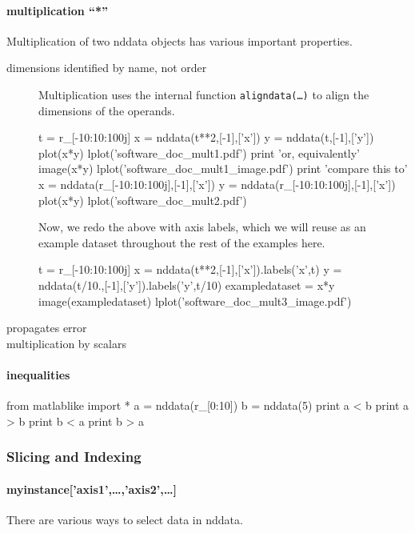 \paragraph{multiplication ``*''}
Multiplication of two nddata objects has various important properties.
\begin{description}
\item[dimensions identified by name, not order]
Multiplication uses the internal function \texttt{aligndata(\ldots)} \label{codelabel:aligndata}
    to align the dimensions of the operands.

\begin{python}
t = r_[-10:10:100j]
x = nddata(t**2,[-1],['x'])
y = nddata(t,[-1],['y'])
plot(x*y)
lplot('software_doc_mult1.pdf')
print 'or, equivalently'
image(x*y)
lplot('software_doc_mult1_image.pdf')
print 'compare this to'
x = nddata(r_[-10:10:100j],[-1],['x'])
y = nddata(r_[-10:10:100j],[-1],['x'])
plot(x*y)
lplot('software_doc_mult2.pdf')
\end{python}

Now, we redo the above with axis labels,
    which we will reuse as an example dataset
    throughout the rest of the examples here.

\begin{python}
t = r_[-10:10:100j]
x = nddata(t**2,[-1],['x']).labels('x',t)
y = nddata(t/10.,[-1],['y']).labels('y',t/10)
exampledataset = x*y
image(exampledataset)
lplot('software_doc_mult3_image.pdf')
\end{python}
\item[propagates error]
\nts{\ldots}
\item[multiplication by scalars]
\nts{\ldots}
\end{description}
\paragraph{inequalities}

\begin{python}
from matlablike import *
a = nddata(r_[0:10])
b = nddata(5)
print a < b
print a > b
print b < a
print b > a
\end{python}
\subsubsection{Slicing and Indexing}
\paragraph{myinstance['axis1',\ldots,'axis2',\ldots]}
There are various ways to select data in nddata.

